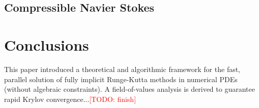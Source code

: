 \documentclass[review]{siamart}
\makeatletter
\newcommand{\todo}[1]{\textcolor{red}{[TODO\@: #1]}}
\makeatother
\begin{document}
\subsection{Compressible Navier Stokes}\label{sec:numerics_nonlin:ns}





\section{Conclusions}\label{sec:conc}

This paper introduced a theoretical and algorithmic framework for the fast, parallel
solution of fully implicit Runge-Kutta methods in numerical PDEs (without algebraic
constraints). A field-of-values analysis is derived to guarantee rapid Krylov
convergence...\todo{finish}




\end{document}
